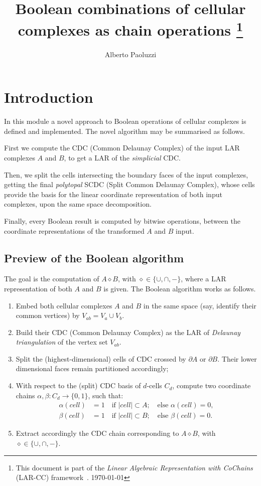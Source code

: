 \documentclass[11pt,oneside]{article}	%
\title{Boolean combinations of cellular complexes as chain operations
\footnote{This document is part of the \emph{Linear Algebraic Representation with CoChains} (LAR-CC) framework~\cite{cclar-proj:2013:00}. \today}
}
\author{Alberto Paoluzzi}
\begin{document}
\maketitle
\tableofcontents
\nonstopmode

\section{Introduction}

In this module a novel approach to Boolean operations of cellular complexes is defined and implemented. The novel algorithm may be summarised as follows. 

First we compute the CDC (Common Delaunay Complex) of the input LAR complexes $A$ and $B$, to get a LAR of the \emph{simplicial} CDC.

Then, we split the cells intersecting the boundary faces of the input complexes, getting the final \emph{polytopal} SCDC  
(Split Common Delaunay Complex), whose cells  provide the  basis for the linear coordinate representation of both input 
complexes, upon the same space decomposition.

Finally, every Boolean result is computed by bitwise operations, between the coordinate representations of the transformed 
$A$ and $B$ input.



\subsection{Preview of the Boolean algorithm}

The goal is the computation of $A \diamond B$, with $\diamond\in \{\cup, \cap, -\}$, where a LAR representation of both $A$ and $B$ is given. The Boolean algorithm works as follows.

\begin{enumerate}
\item 
Embed both cellular complexes $A$ and $B$ in the same space (say, identify their common vertices) by $V_{ab} = V_a \cup V_b$.
\item 
Build their CDC  (Common Delaunay Complex) as the LAR of \emph{Delaunay triangulation} of the vertex set $V_{ab}$.
\item 
Split the (highest-dimensional) cells of CDC crossed by $\partial A$ or $\partial B$. Their lower dimensional faces remain partitioned accordingly;
\item 
With respect to the (split) CDC basis of $d$-cells $C_d$, compute two coordinate chains $\alpha,\beta: C_d \to \{0,1\}$, such that: 
\begin{align}
	\alpha(cell) &= 1  \quad\mbox{if\ } |cell| \subset A;  \quad\mbox{else\ } \alpha(cell) = 0, \nonumber\\
	\beta(cell) &= 1  \quad\mbox{if\ } |cell| \subset B;  \quad\mbox{else\ } \beta(cell) = 0. \nonumber
\end{align}
\item 
Extract accordingly the CDC chain corresponding to $A \diamond B$, with $\diamond\in \{\cup, \cap, -\}$.
\end{enumerate}
\end{document}
